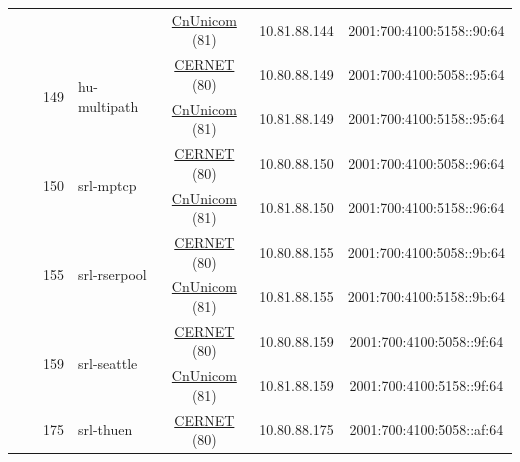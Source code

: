 \begin{small}
\begin{center}
\begin{longtable}{|c|c|c|c|c|c|c|c|}
  &  &  &  & \multicolumn{2}{|c|}{\tiny{\href{http://www.chinaunicom.com}{CnUnicom} (81)}} & \tiny{10.81.88.144} & \tiny{2001:700:4100:5158::90:64} \\* \cline{3-3}\cline{4-4}\cline{5-5}\cline{6-6}\cline{7-7}\cline{8-8}
  &  & \multirow{2}{*}{\tiny{149}} & \multicolumn{1}{|l|}{\multirow{2}{*}{\tiny{hu-multipath}}} & \multicolumn{2}{|c|}{\tiny{\href{http://www.cernet.edu.cn}{CERNET} (80)}} & \tiny{10.80.88.149} & \tiny{2001:700:4100:5058::95:64} \\* \cline{5-5}\cline{6-6}\cline{7-7}\cline{8-8}
  &  &  &  & \multicolumn{2}{|c|}{\tiny{\href{http://www.chinaunicom.com}{CnUnicom} (81)}} & \tiny{10.81.88.149} & \tiny{2001:700:4100:5158::95:64} \\* \cline{3-3}\cline{4-4}\cline{5-5}\cline{6-6}\cline{7-7}\cline{8-8}
  &  & \multirow{2}{*}{\tiny{150}} & \multicolumn{1}{|l|}{\multirow{2}{*}{\tiny{srl-mptcp}}} & \multicolumn{2}{|c|}{\tiny{\href{http://www.cernet.edu.cn}{CERNET} (80)}} & \tiny{10.80.88.150} & \tiny{2001:700:4100:5058::96:64} \\* \cline{5-5}\cline{6-6}\cline{7-7}\cline{8-8}
  &  &  &  & \multicolumn{2}{|c|}{\tiny{\href{http://www.chinaunicom.com}{CnUnicom} (81)}} & \tiny{10.81.88.150} & \tiny{2001:700:4100:5158::96:64} \\* \cline{3-3}\cline{4-4}\cline{5-5}\cline{6-6}\cline{7-7}\cline{8-8}
  &  & \multirow{2}{*}{\tiny{155}} & \multicolumn{1}{|l|}{\multirow{2}{*}{\tiny{srl-rserpool}}} & \multicolumn{2}{|c|}{\tiny{\href{http://www.cernet.edu.cn}{CERNET} (80)}} & \tiny{10.80.88.155} & \tiny{2001:700:4100:5058::9b:64} \\* \cline{5-5}\cline{6-6}\cline{7-7}\cline{8-8}
  &  &  &  & \multicolumn{2}{|c|}{\tiny{\href{http://www.chinaunicom.com}{CnUnicom} (81)}} & \tiny{10.81.88.155} & \tiny{2001:700:4100:5158::9b:64} \\* \cline{3-3}\cline{4-4}\cline{5-5}\cline{6-6}\cline{7-7}\cline{8-8}
  &  & \multirow{2}{*}{\tiny{159}} & \multicolumn{1}{|l|}{\multirow{2}{*}{\tiny{srl-seattle}}} & \multicolumn{2}{|c|}{\tiny{\href{http://www.cernet.edu.cn}{CERNET} (80)}} & \tiny{10.80.88.159} & \tiny{2001:700:4100:5058::9f:64} \\* \cline{5-5}\cline{6-6}\cline{7-7}\cline{8-8}
  &  &  &  & \multicolumn{2}{|c|}{\tiny{\href{http://www.chinaunicom.com}{CnUnicom} (81)}} & \tiny{10.81.88.159} & \tiny{2001:700:4100:5158::9f:64} \\* \cline{3-3}\cline{4-4}\cline{5-5}\cline{6-6}\cline{7-7}\cline{8-8}
  &  & \multirow{2}{*}{\tiny{175}} & \multicolumn{1}{|l|}{\multirow{2}{*}{\tiny{srl-thuen}}} & \multicolumn{2}{|c|}{\tiny{\href{http://www.cernet.edu.cn}{CERNET} (80)}} & \tiny{10.80.88.175} & \tiny{2001:700:4100:5058::af:64} \\* \cline{5-5}\cline{6-6}\cline{7-7}\cline{8-8}

\end{longtable}
\end{center}
\end{small}
